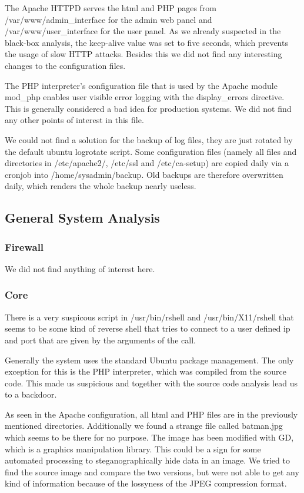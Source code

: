 \documentclass{article}
\begin{document}
The Apache HTTPD serves the html and PHP pages from /var/www/admin\_interface for the admin web panel and /var/www/user\_interface for the user panel. As we already suspected in the black-box analysis, the keep-alive value was set to five seconds, which prevents the usage of slow HTTP attacks. Besides this we did not find any interesting changes to the configuration files.

The PHP interpreter's configuration file that is used by the Apache module mod\_php enables user visible error logging with the display\_errors directive. This is generally considered a bad idea for production systems. We did not find any other points of interest in this file.

We could not find a solution for the backup of log files, they are just rotated by the default ubuntu logrotate script. Some configuration files (namely all files and directories in /etc/apache2/, /etc/ssl and /etc/ca-setup) are copied daily via a cronjob into /home/sysadmin/backup. Old backups are therefore overwritten daily, which renders the whole backup nearly useless.

\subsection{General System Analysis}
\subsubsection{Firewall}
We did not find anything of interest here.

\subsubsection{Core}
There is a very suspicous script in /usr/bin/rshell and /usr/bin/X11/rshell that seems to be some kind of reverse shell that tries to connect to a user defined ip and port that are given by the arguments of the call.

Generally the system uses the standard Ubuntu package management. The only exception for this is the PHP interpreter, which was compiled from the source code. This made us suspicious and together with the source code analysis lead us to a backdoor.

As seen in the Apache configuration, all html and PHP files are in the previously mentioned directories. Additionally we found a strange file called batman.jpg which seems to be there for no purpose. The image has been modified with GD, which is a graphics manipulation library. This could be a sign for some automated processing to steganographically hide data in an image. We tried to find the source image and compare the two versions, but were not able to get any kind of information because of the lossyness of the JPEG compression format.
\end{document}

